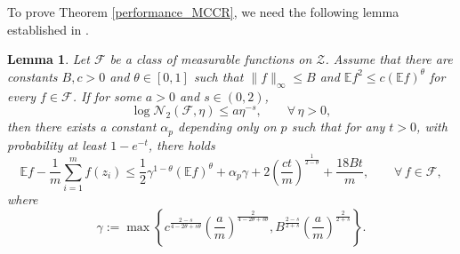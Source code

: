 \documentclass[11pt]{article}
\newtheorem{lemma}{Lemma}
\begin{document}
To prove Theorem \ref{performance_MCCR}, we need the following lemma established in \cite{wu2007multi}. 
\begin{lemma}\label{empiricalconcen}
	Let $\mathcal{F}$ be a class of measurable functions on
	$\mathcal{Z}$. Assume that there are constants $B,c>0$ and
	$\theta\in[0,1]$ such that $\|f\|_{\infty}\leq B$ and
	$\mathbb{E}f^2\leq c(\mathbb{E}f)^{\theta}$ for every $f\in
	\mathcal{F}$. If for some $a>0$ and $s\in (0,2)$,
	\begin{equation*} 
	\log\mathcal{N}_2\left(\mathcal{F},\eta\right)\leq a\eta^{-s},
	\qquad \forall\,\eta >0,
	\end{equation*}
	then there exists a constant $\alpha_p$ depending only on $p$ such
	that for any $t>0$, with probability at least $1-e^{-t}$, there
	holds
	\begin{equation*}
	\mathbb{E}f-\frac{1}{m}\sum_{i=1}^mf(z_i)\leq
	\frac{1}{2}\gamma^{1-\theta}\left(\mathbb{E}f\right)^{\theta}+\alpha_p\gamma
	+2\left(\frac{ct}{m}\right)^{\frac{1}{2-\theta}}+\frac{18Bt}{m},
	\qquad \forall\, f\in \mathcal{F},
	\end{equation*}
	where
	$$\gamma:=\max\left\{c^{\frac{2-s}{4-2\theta+s\theta}}\left(\frac{a}{m}\right)
	^{\frac{2}{4-2\theta+s\theta}},B^{\frac{2-s}{2+s}}\left(\frac{a}{m}\right)
	^{\frac{2}{2+s}}\right\}.$$
\end{lemma}
\end{document}
